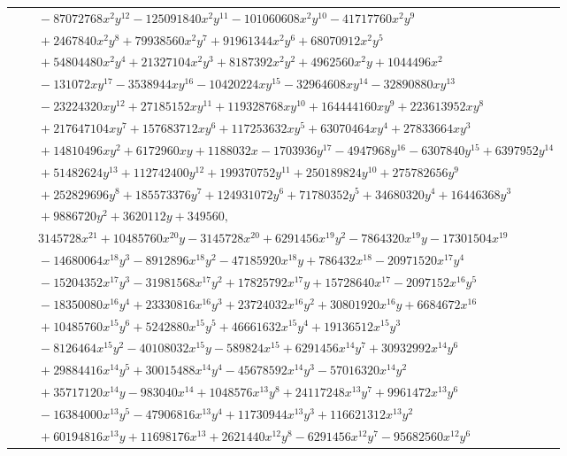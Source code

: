 \documentclass[11pt]{article}
\begin{document}
\begin{longtable}{@{}ll@{}}
 & $\quad -87072768x^{2}y^{12}-125091840x^{2}y^{11}-101060608x^{2}y^{10}-41717760x^{2}y^{9}$\\
 & $\quad +2467840x^{2}y^{8}+79938560x^{2}y^{7}+91961344x^{2}y^{6}+68070912x^{2}y^{5}$\\
 & $\quad +54804480x^{2}y^{4}+21327104x^{2}y^{3}+8187392x^{2}y^{2}+4962560x^{2}y+1044496x^{2}$\\
 & $\quad -131072xy^{17}-3538944xy^{16}-10420224xy^{15}-32964608xy^{14}-32890880xy^{13}$\\
 & $\quad -23224320xy^{12}+27185152xy^{11}+119328768xy^{10}+164444160xy^{9}+223613952xy^{8}$\\
 & $\quad +217647104xy^{7}+157683712xy^{6}+117253632xy^{5}+63070464xy^{4}+27833664xy^{3}$\\
 & $\quad +14810496xy^{2}+6172960xy+1188032x-1703936y^{17}-4947968y^{16}-6307840y^{15}+6397952y^{14}$\\
 & $\quad +51482624y^{13}+112742400y^{12}+199370752y^{11}+250189824y^{10}+275782656y^{9}$\\
 & $\quad +252829696y^{8}+185573376y^{7}+124931072y^{6}+71780352y^{5}+34680320y^{4}+16446368y^{3}$\\
 & $\quad +9886720y^{2}+3620112y+349560,$\\
 & $\quad 3145728x^{21}+10485760x^{20}y-3145728x^{20}+6291456x^{19}y^{2}-7864320x^{19}y-17301504x^{19}$\\
 & $\quad -14680064x^{18}y^{3}-8912896x^{18}y^{2}-47185920x^{18}y+786432x^{18}-20971520x^{17}y^{4}$\\
 & $\quad -15204352x^{17}y^{3}-31981568x^{17}y^{2}+17825792x^{17}y+15728640x^{17}-2097152x^{16}y^{5}$\\
 & $\quad -18350080x^{16}y^{4}+23330816x^{16}y^{3}+23724032x^{16}y^{2}+30801920x^{16}y+6684672x^{16}$\\
 & $\quad +10485760x^{15}y^{6}+5242880x^{15}y^{5}+46661632x^{15}y^{4}+19136512x^{15}y^{3}$\\
 & $\quad -8126464x^{15}y^{2}-40108032x^{15}y-589824x^{15}+6291456x^{14}y^{7}+30932992x^{14}y^{6}$\\
 & $\quad +29884416x^{14}y^{5}+30015488x^{14}y^{4}-45678592x^{14}y^{3}-57016320x^{14}y^{2}$\\
 & $\quad +35717120x^{14}y-983040x^{14}+1048576x^{13}y^{8}+24117248x^{13}y^{7}+9961472x^{13}y^{6}$\\
 & $\quad -16384000x^{13}y^{5}-47906816x^{13}y^{4}+11730944x^{13}y^{3}+116621312x^{13}y^{2}$\\
 & $\quad +60194816x^{13}y+11698176x^{13}+2621440x^{12}y^{8}-6291456x^{12}y^{7}-95682560x^{12}y^{6}$\\

\end{longtable}
\end{document}
